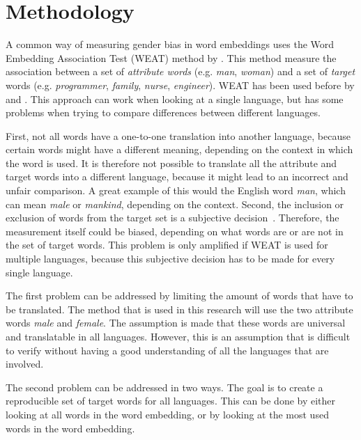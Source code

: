 \section{Methodology}
A common way of measuring gender bias in word embeddings uses the 
Word Embedding Association Test (WEAT) method by
\textcite{caliskan_2017_semantics_language_corpora}. This method measure the
association between a set of \textit{attribute words} (e.g. \textit{man}, \textit{woman}) 
and a set of \textit{target} words (e.g. \textit{programmer}, \textit{family},
\textit{nurse}, \textit{engineer}).
WEAT has been used before by \textcite{gonen-goldberg-2019-lipstick-pig}
and \textcite{10.1145/3306618.3314270}.
This approach can work when looking at a single language, but has some problems when
trying to compare differences between different languages.

First, not all words have a one-to-one translation into another
language, because certain words might have a different meaning, depending on the
context in which the word is used. It is therefore not possible to translate all the
attribute and target words into a different language, because it might lead to an
incorrect and unfair comparison. A great example of this would the English word
\textit{man}, which can mean \textit{male} or \textit{mankind}, depending on the context.
Second, the inclusion or exclusion of words from
the target set is a subjective decision~\parencite{nissim_fair_is_better_2020}. Therefore,
the measurement itself could be biased, depending on what words are or are not in the set
of target words. This problem is only amplified if WEAT is used for multiple languages,
because this subjective decision has to be made for every single language.

The first problem can be addressed by limiting the amount of words that have to be
translated. The method that is used in this research will use the two attribute words 
\textit{male} and \textit{female}. The assumption is made that these words are universal
and translatable in all languages. However, this is an assumption that is difficult to
verify without having a good understanding of all the languages that are involved.

The second problem can be addressed in two ways. The goal is to create a reproducible
set of target words for all languages. This can be done by either looking at all words
in the
word embedding, or by looking at the most used words in the word embedding.

